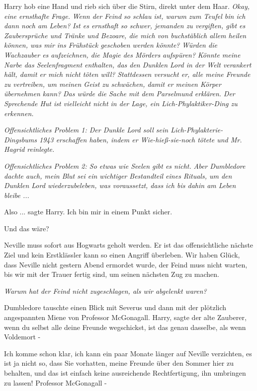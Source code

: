 Harry hob eine Hand und rieb sich über die Stirn, direkt unter dem Haar.
\emph{Okay, eine ernsthafte Frage.}
\emph{Wenn der Feind so schlau ist, warum zum Teufel bin ich dann noch am
Leben?} \emph{Ist es ernsthaft so schwer, jemanden zu vergiften, gibt es
Zaubersprüche und Tränke und Bezoare, die mich von buchstäblich allem heilen
können, was mir ins Frühstück geschoben werden könnte?}
\emph{Würden die Wachzauber es aufzeichnen, die Magie des Mörders aufspüren?}
\emph{Könnte meine Narbe das Seelenfragment enthalten, das den Dunklen Lord in
der Welt verankert hält, damit er mich nicht töten will?} \emph{Stattdessen
versucht er, alle meine Freunde zu vertreiben, um meinen Geist zu schwächen,
damit er meinen Körper übernehmen kann?}
\emph{Das würde die Sache mit dem Parselmund erklären.}
\emph{Der Sprechende Hut ist vielleicht nicht in der Lage, ein
Lich-Phylaktiker-Ding zu erkennen.}

\emph{Offensichtliches Problem 1: Der Dunkle Lord soll sein
Lich-Phylakterie-Dingsbums 1943 erschaffen haben, indem er Wie-hieß-sie-noch
tötete und Mr. Hagrid reinlegte.}

\emph{Offensichtliches Problem 2: So etwas wie Seelen gibt es nicht.}
\emph{Aber Dumbledore dachte auch, mein Blut sei ein wichtiger Bestandteil eines
Rituals, um den Dunklen Lord wiederzubeleben, was voraussetzt, dass ich bis
dahin am Leben bleibe ...}

\glqq{}Also ...\grqq{} sagte Harry. \glqq{}Ich bin mir in einem Punkt
sicher.\grqq{}

\glqq{}Und das wäre?\grqq{}

\glqq{}Neville muss sofort aus Hogwarts geholt werden. Er ist das offensichtliche
nächste Ziel und kein Erstklässler kann so einen Angriff überleben. Wir haben
Glück, dass Neville nicht gestern Abend ermordet wurde, der Feind muss nicht
warten, bis wir mit der Trauer fertig sind, um seinen nächsten Zug zu
machen.\grqq{}

\emph{Warum hat der Feind nicht zugeschlagen, als wir abgelenkt waren?}

Dumbledore tauschte einen Blick mit Severus und dann mit der plötzlich
angespannten Miene von Professor McGonagall. \glqq{}Harry\grqq{}, sagte der alte
Zauberer, \glqq{}wenn du selbst alle deine Freunde wegschickst, ist das genau
dasselbe, als wenn Voldemort -\grqq{}

\glqq{}Ich komme schon klar, ich kann ein paar Monate länger auf Neville
verzichten, es ist ja nicht so, dass Sie vorhatten, meine Freunde über den
Sommer hier zu behalten, und das ist einfach keine ausreichende Rechtfertigung,
ihn umbringen zu lassen! Professor McGonagall -\grqq{}

